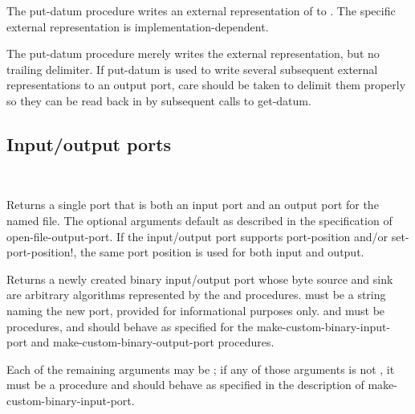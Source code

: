 \begin{entry}{%
}

The {\cf put-datum} procedure writes an external representation of
 to .
The specific external representation is implementation-dependent.

\begin{note}
  The {\cf put-datum} procedure merely writes the external
  representation, but no trailing delimiter.  If {\cf put-datum} is
  used to write several subsequent external representations to an
  output port, care should be taken to delimit them properly so they can
  be read back in by subsequent calls to {\cf get-datum}.
\end{note}
\end{entry}


\subsection{Input/output ports}

\begin{entry}{%
\\
}
   
Returns a single port that is both an input port and an
output port for the named file.
The optional arguments default as described in the specification
of {\cf open-file-output-port}.
If the input/output port supports {\cf port-position} and/or
{\cf set-port-position!}, the same port position is used
for both input and output.
\end{entry}

\begin{entry}{%
}

Returns a newly created binary input/output port whose
byte source and sink are
arbitrary algorithms represented by the  and 
procedures.
 must be a string naming the new port,
provided for informational purposes only.
 and  must be procedures,
and should behave as specified for the
{\cf make-custom-binary-input-port} and
{\cf make-custom-binary-output-port} procedures.

Each of the remaining arguments may be \schfalse{}; if any of
those arguments is not \schfalse{}, it must be a procedure and
should behave as specified in the description of
{\cf make-custom-binary-input-port}.
\end{entry}

